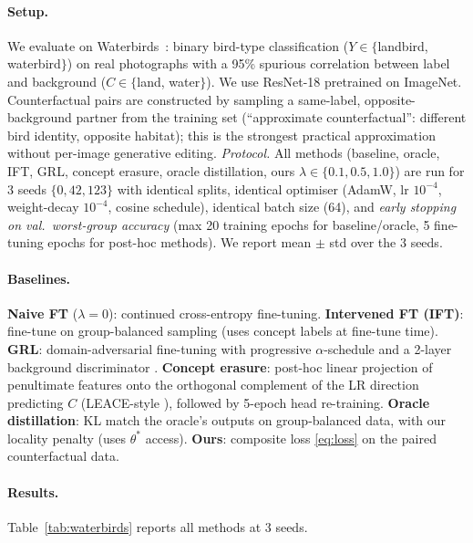 \documentclass{article}
\begin{document}
\paragraph{Setup.}
We evaluate on Waterbirds~\cite{sagawa2020dro}: binary bird-type classification
($Y\!\in\!\{$landbird, waterbird$\}$) on real photographs with a 95\% spurious
correlation between label and background ($C\!\in\!\{$land, water$\}$).  We use
ResNet-18 pretrained on ImageNet.  Counterfactual pairs are constructed by
sampling a same-label, opposite-background partner from the training set
(``approximate counterfactual'': different bird identity, opposite habitat); this is
the strongest practical approximation without per-image generative editing.
\emph{Protocol.}  All methods (baseline, oracle, IFT, GRL, concept erasure,
oracle distillation, ours $\lambda\!\in\!\{0.1,0.5,1.0\}$) are run for 3 seeds
$\{0, 42, 123\}$ with identical splits, identical optimiser
(AdamW, lr $10^{-4}$, weight-decay $10^{-4}$, cosine schedule), identical batch
size (64), and \emph{early stopping on val.\ worst-group accuracy} (max 20
training epochs for baseline/oracle, 5 fine-tuning epochs for post-hoc methods).
We report mean $\pm$ std over the 3 seeds.

\paragraph{Baselines.}
\textbf{Naive FT} ($\lambda{=}0$): continued cross-entropy fine-tuning.
\textbf{Intervened FT (IFT)}: fine-tune on group-balanced sampling
(uses concept labels at fine-tune time).
\textbf{GRL}: domain-adversarial fine-tuning with progressive
$\alpha$-schedule and a 2-layer background discriminator
\cite{ganin2016domain}.
\textbf{Concept erasure}: post-hoc linear projection of penultimate features
onto the orthogonal complement of the LR direction predicting $C$ (LEACE-style
\cite{belrose2023concept}), followed by 5-epoch head re-training.
\textbf{Oracle distillation}: KL match the oracle's outputs on group-balanced
data, with our locality penalty (uses $\theta^*$ access).
\textbf{Ours}: composite loss \eqref{eq:loss} on the paired counterfactual data.

\paragraph{Results.}
Table~\ref{tab:waterbirds} reports all methods at 3 seeds.
\end{document}

